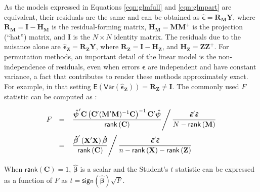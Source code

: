 As the models expressed in Equations \ref{eqn:glmfull} and \ref{eqn:glmpart} are equivalent, their residuals are the same and can be obtained as  $\boldsymbol{\hat{\epsilon}} = \mathbf{R}_{\mathbf{M}}\mathbf{Y}$, where $\mathbf{R}_{\mathbf{M}}=\mathbf{I}-\mathbf{H}_{\mathbf{M}}$ is the residual-forming matrix, $\mathbf{H}_{\mathbf{M}}=\mathbf{M}\mathbf{M}^{+}$ is the projection (``hat'') matrix, and $\mathbf{I}$ is the $N \times N$ identity matrix. The residuals due to the nuisance alone are $\boldsymbol{\hat{\epsilon}}_{\mathbf{Z}} = \mathbf{R}_{\mathbf{Z}}\mathbf{Y}$, where $\mathbf{R}_{\mathbf{Z}}=\mathbf{I}-\mathbf{H}_{\mathbf{Z}}$, and $\mathbf{H}_{\mathbf{Z}} = \mathbf{Z}\mathbf{Z}^{+}$. For permutation methods, an important detail of the linear model is the non-independence of residuals, even when errors $\boldsymbol{\epsilon}$ are independent and have constant variance, a fact that contributes to render these methods approximately exact. For example, in that setting $\mathsf{E}\left(\mathsf{Var}(\boldsymbol{\hat{\epsilon}_{\mathbf{Z}}})\right)=\mathbf{R}_{\mathbf{Z}}\neq\mathbf{I}$. The commonly used $F$ statistic can be computed as \citep{Christensen2002}:

\begin{equation}
\begin{array}{ccl}
F &=& \left.\dfrac{\boldsymbol{\hat{\psi}}'\mathbf{C} \left(\mathbf{C}'(\mathbf{M}'\mathbf{M})^{-1}\mathbf{C} \right)^{-1} \mathbf{C}'\boldsymbol{\hat{\psi}}}{\mathsf{rank}\left(\mathbf{C}\right)} \right/ \dfrac{\boldsymbol{\hat{\epsilon}}'\boldsymbol{\hat{\epsilon}}}{N-\mathsf{rank}\left(\mathbf{M}\right)}\\[15pt]
{} & = & \left.\dfrac{\boldsymbol{\hat{\beta}}' \left(\mathbf{X}'\mathbf{X}\right)\boldsymbol{\hat{\beta}}}{\mathsf{rank}\left(\mathbf{C}\right)} \right/ \dfrac{\boldsymbol{\hat{\epsilon}}'\boldsymbol{\hat{\epsilon}}}{n-\mathsf{rank}\left(\mathbf{X}\right)-\mathsf{rank}\left(\mathbf{Z}\right)}
\end{array}
\label{eqn:fstat}
\end{equation}

\noindent
When $\mathsf{rank}(\mathbf{C}) = 1$, $\boldsymbol{\hat{\beta}}$ is a scalar and the Student's $t$ statistic can be expressed as a function of $F$ as $t=\mathsf{sign}(\boldsymbol{\hat{\beta}})\sqrt{F}$.

